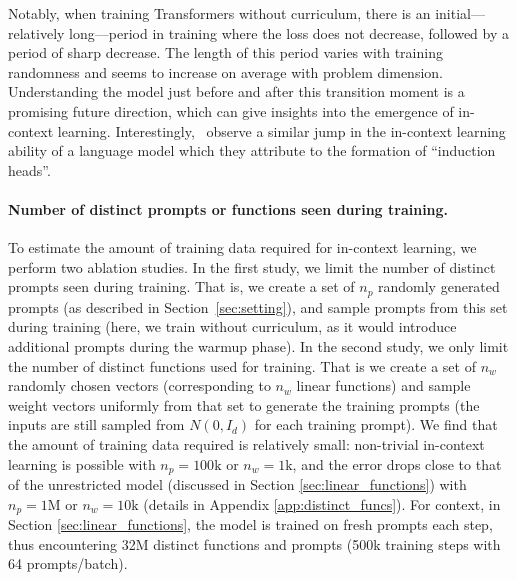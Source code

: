 Notably, when training Transformers without curriculum, there is an initial---relatively long---period  in training where the loss does not decrease, followed by a period of sharp decrease.
The length of this period varies with training randomness and seems to increase on average with problem dimension.
Understanding the model just before and after this transition moment is a promising future direction, which can give insights into the emergence of  in-context learning. 
Interestingly,~\citet{olsson2022context} observe a similar jump in the in-context learning ability of a language model which they attribute to the formation of ``induction heads''.

\paragraph{Number of distinct prompts or functions seen during training.} 
To estimate the amount of training data required for in-context learning, we perform two ablation studies. In the first study, we limit the number of distinct prompts seen during training. That is, we create a set of $n_p$ randomly generated prompts (as described in Section~\ref{sec:setting}), and sample prompts from this set during training (here, we train without curriculum, as it would introduce additional prompts during the warmup phase). In the second study, we only limit the number of distinct functions used for training.
That is we create a set of $n_w$ randomly chosen vectors (corresponding to $n_w$ linear functions) and sample weight vectors uniformly from that set to generate the training prompts (the inputs are still sampled from $N(0, I_d)$ for each training prompt).
We find that the amount of training data required is relatively small: non-trivial in-context learning is possible with $n_p = 100\text{k}$  or $n_w = 1\text{k}$, and the error drops close to that of the unrestricted model (discussed in Section \ref{sec:linear_functions}) with $n_p = 1\text{M}$ or $n_w = 10\text{k}$ (details in Appendix \ref{app:distinct_funcs}).
For context, in Section \ref{sec:linear_functions}, the model is trained on fresh prompts each step, thus encountering 32M distinct functions and prompts (500k training steps with 64 prompts/batch). 
